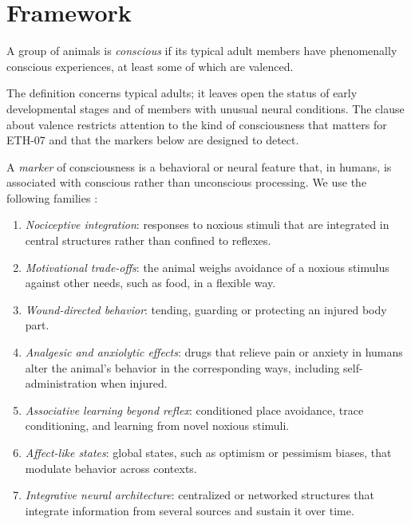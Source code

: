 \documentclass{situationist-preprint}
\begin{document}
\section{Framework}

\begin{definition}\label{d:cons}
A group of animals is \emph{conscious} if its typical adult members have phenomenally conscious experiences, at least some of which are valenced.
\end{definition}

The definition concerns typical adults; it leaves open the status of early developmental stages and of members with unusual neural conditions. The clause about valence restricts attention to the kind of consciousness that matters for ETH-07 and that the markers below are designed to detect.

\begin{definition}[Markers]\label{d:markers}
A \emph{marker} of consciousness is a behavioral or neural feature that, in humans, is associated with conscious rather than unconscious processing. We use the following families \citep{Birch2022,Gibbons2022}:
\begin{enumerate}
\item[(M1)] \emph{Nociceptive integration}: responses to noxious stimuli that are integrated in central structures rather than confined to reflexes.
\item[(M2)] \emph{Motivational trade-offs}: the animal weighs avoidance of a noxious stimulus against other needs, such as food, in a flexible way.
\item[(M3)] \emph{Wound-directed behavior}: tending, guarding or protecting an injured body part.
\item[(M4)] \emph{Analgesic and anxiolytic effects}: drugs that relieve pain or anxiety in humans alter the animal's behavior in the corresponding ways, including self-administration when injured.
\item[(M5)] \emph{Associative learning beyond reflex}: conditioned place avoidance, trace conditioning, and learning from novel noxious stimuli.
\item[(M6)] \emph{Affect-like states}: global states, such as optimism or pessimism biases, that modulate behavior across contexts.
\item[(M7)] \emph{Integrative neural architecture}: centralized or networked structures that integrate information from several sources and sustain it over time.
\end{enumerate}
\end{definition}
\end{document}
